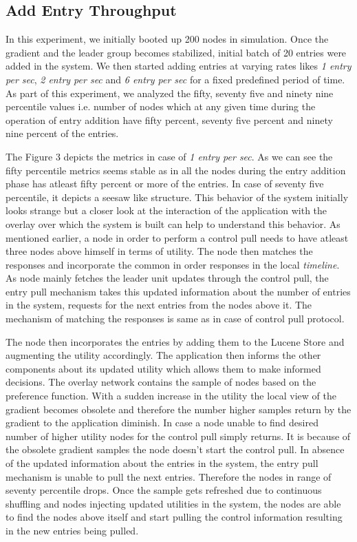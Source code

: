 \documentclass[a4paper, 11pt]{article}
\begin{document}
\subsection{Add Entry Throughput}

In this experiment, we initially booted up 200 nodes in simulation. Once the gradient and the leader group becomes stabilized, initial batch of 20 entries were added in the system. We then started adding entries at varying rates likes \textit{1 entry per sec}, \textit{2 entry per sec} and  \textit{6 entry per sec} for a fixed predefined period of time. As part of this experiment, we analyzed the fifty, seventy five and ninety nine percentile values i.e. number of nodes which at any given time during the operation of entry addition have fifty percent, seventy five percent and ninety nine percent of the entries. 

\par The Figure 3 depicts the metrics in case of \textit{1 entry per sec}. As we can see the fifty percentile metrics seems stable as in all the nodes during the entry addition phase has atleast fifty percent or more of the entries. In case of seventy five percentile, it depicts a seesaw like structure. This behavior of the system initially looks strange but a closer look at the interaction of the application with the overlay over which the system is built can help to understand this behavior. As mentioned earlier, a node in order to perform a control pull needs to have atleast three nodes above himself in terms of utility. The node then matches the responses and incorporate the common in order responses in the local \textit{timeline}. As node mainly fetches the leader unit updates through the control pull, the entry pull mechanism takes this updated information about the number of entries in the system, requests for the next entries from the nodes above it. The mechanism of matching the responses is same as in case of control pull protocol. 
\par The node then incorporates the entries by adding them to the Lucene Store and augmenting the utility accordingly. The application then informs the other components about its updated utility which allows them to make informed decisions. The overlay network contains the sample of nodes based on the preference function. With a sudden increase in the utility the local view of the gradient becomes obsolete and therefore the number higher samples return by the gradient to the application diminish. In case a node unable to find desired number of higher utility nodes for the control pull simply returns. It is because of the obsolete gradient samples the node doesn't start the control pull. In absence of the updated information about the entries in the system, the entry pull mechanism is unable to pull the next entries. Therefore the nodes in range of seventy percentile drops. Once the sample gets refreshed due to continuous shuffling and nodes injecting updated utilities in the system, the nodes are able to find the nodes above itself and start pulling the control information  resulting in the new entries being pulled.
\end{document}
